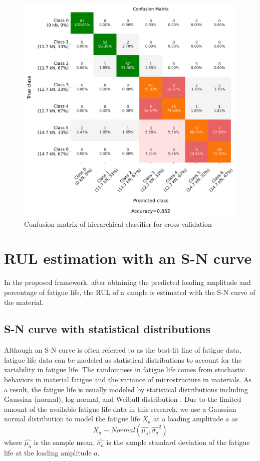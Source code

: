 \begin{figure}[tb]
    \includegraphics[width=0.9\linewidth]{fig/hierarchical_confusion_matrix.png}
    \caption{Confusion matrix of hierarchical classifier for cross-validation}
    \label{fig: confu mat hier}
\end{figure}


\section{RUL estimation with an S-N curve}
In the proposed framework, after obtaining the predicted loading amplitude and percentage of fatigue life, the RUL of a sample is estimated with the S-N curve of the material.

\subsection{S-N curve with statistical distributions}
\label{subsec: statistical sn curve}
Although an S-N curve is often referred to as the best-fit line of fatigue data, fatigue life data can be modeled as statistical distributions to account for the variability in fatigue life. The randomness in fatigue life comes from stochastic behaviors in material fatigue and the variance of microstructure in materials. As a result, the fatigue life is usually modeled by statistical distributions including Gaussian (normal), log-normal, and Weibull distribution \cite{sn-curve-statistical-model-LI2016}. Due to the limited amount of the available fatigue life data in this research, we use a Gaussian normal distribution to model the fatigue life $X_a$ at a loading amplitude $a$ as
\begin{equation}
    X_a \sim Normal(\hat{\mu_{a}}, \hat{\sigma_{a}}^2)
\end{equation}
where $\hat{\mu_{a}}$ is the sample mean, $\hat{\sigma_{a}}$ is the sample standard deviation of the fatigue life at the loading amplitude $a$.

